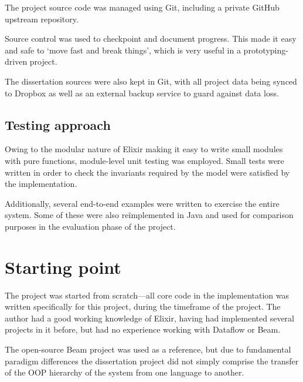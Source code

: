 The project source code was managed using Git, including a private GitHub upstream repository.

Source control was used to checkpoint and document progress.
This made it easy and safe to `move fast and break things', which is very useful in a prototyping-driven project.

The dissertation sources were also kept in Git, with all project data being synced to Dropbox as well as an external backup service to guard against data loss.

\subsection{Testing approach}\label{sec:prep:softeng:testing}

Owing to the modular nature of Elixir making it easy to write small modules with pure functions, module-level unit testing was employed.
Small tests were written in order to check the invariants required by the model were satisfied by the implementation.

Additionally, several end-to-end examples were written to exercise the entire system.
Some of these were also re\"implemented in Java and used for comparison purposes in the evaluation phase of the project.

\section{Starting point}\label{sec:prep:starting}

The project was started from scratch---all core code in the implementation was written specifically for this project, during the timeframe of the project.
The author had a good working knowledge of Elixir, having had implemented several projects in it before, but had no experience working with Dataflow or Beam.

The open-source Beam project was used as a reference, but due to fundamental paradigm differences the dissertation project did not simply comprise the transfer of the OOP hierarchy of the system from one language to another.